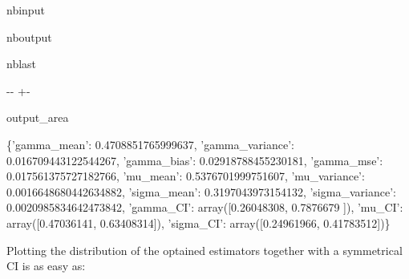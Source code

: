 \documentclass[a4paper,11pt,openany,english]{sphinxmanual}
\begin{document}
\begin{sphinxuseclass}{nbinput}
{
\begin{sphinxVerbatim}[commandchars=\\\{\}]
\llap{\color{nbsphinxin}[3]:\,\hspace{\fboxrule}\hspace{\fboxsep}}  
\end{sphinxVerbatim}
}

\end{sphinxuseclass}
\begin{sphinxuseclass}{nboutput}
\begin{sphinxuseclass}{nblast}
{

\kern-\sphinxverbatimsmallskipamount\kern-\baselineskip
\kern+\FrameHeightAdjust\kern-\fboxrule
\vspace{\nbsphinxcodecellspacing}

\begin{sphinxuseclass}{output_area}
\begin{sphinxuseclass}{}


\begin{sphinxVerbatim}[commandchars=\\\{\}]
\llap{\color{nbsphinxout}[3]:\,\hspace{\fboxrule}\hspace{\fboxsep}}\{'gamma\_mean': 0.4708851765999637,
 'gamma\_variance': 0.016709443122544267,
 'gamma\_bias': 0.02918788455230181,
 'gamma\_mse': 0.017561375727182766,
 'mu\_mean': 0.5376701999751607,
 'mu\_variance': 0.0016648680442634882,
 'sigma\_mean': 0.3197043973154132,
 'sigma\_variance': 0.0020985834642473842,
 'gamma\_CI': array([0.26048308, 0.7876679 ]),
 'mu\_CI': array([0.47036141, 0.63408314]),
 'sigma\_CI': array([0.24961966, 0.41783512])\}
\end{sphinxVerbatim}



\end{sphinxuseclass}
\end{sphinxuseclass}
}

\end{sphinxuseclass}
\end{sphinxuseclass}
\sphinxAtStartPar
Plotting the distribution of the optained estimators together with a symmetrical CI is as easy as:
\end{document}
